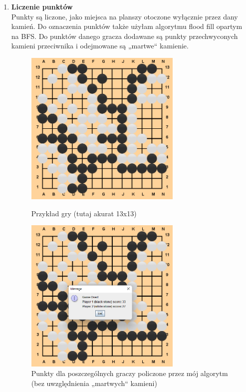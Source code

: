\documentclass{article}
\newcommand{\q}[1]{„#1“}
\begin{document}
\begin{enumerate}
          \newpage
    \item \textbf{Liczenie punktów}\\
          Punkty są liczone, jako miejsca na planszy otoczone wyłącznie
          przez dany kamień. Do oznaczenia punktów także użyłam algorytmu flood fill
          opartym na BFS. Do punktów danego gracza dodawane są punkty
          przechwyconych kamieni przeciwnika i odejmowane są \q{martwe} kamienie.


          \begin{figure}[H]
              \centering%
              \begin{minipage}{\textwidth}
                  \centering
                  \includegraphics[width=7.5cm]{imgs/countingPointsBoard.png}
                  \caption{Przykład gry (tutaj akurat 13x13)}
                  \centering
                  \includegraphics[width=7.5cm]{imgs/gameOver2.png}
                  \caption{Punkty dla poszczególnych graczy policzone przez mój algorytm
                      (bez uwzględnienia \q{martwych} kamieni)}
              \end{minipage}
          \end{figure}%


\end{enumerate}
\end{document}
